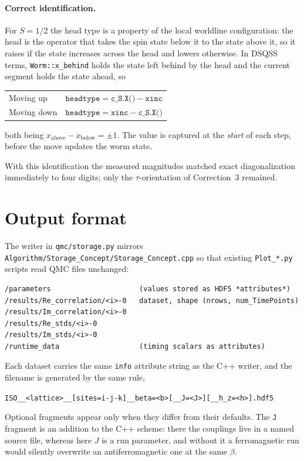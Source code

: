 \documentclass[11pt,a4paper]{article}
\newcommand{\code}[1]{\texttt{#1}}
\begin{document}
\paragraph{Correct identification.} For $S=1/2$ the head type is a property of
the local worldline configuration: the head is the operator that takes the spin
state below it to the state above it, so it raises if the state increases across
the head and lowers otherwise. In DSQSS terms, \code{Worm::x\_behind} holds the
state left behind by the head and the current segment holds the state ahead, so
\begin{center}
\begin{tabular}{ll}
\toprule
Moving up   & $\code{headtype} = \code{c\_S.X()} - \code{xinc}$ \\
Moving down & $\code{headtype} = \code{xinc} - \code{c\_S.X()}$ \\
\bottomrule
\end{tabular}
\end{center}
both being $x_{\text{above}}-x_{\text{below}}=\pm1$. The value is captured at
the \emph{start} of each step, before the move updates the worm state.

With this identification the measured magnitudes matched exact diagonalization
immediately to four digits; only the $\tau$-orientation of
Correction~3 remained.

\section{Output format}
\label{sec:output}

The writer in \code{qmc/storage.py} mirrors
\code{Algorithm/Storage\_Concept/Storage\_Concept.cpp} so that existing
\code{Plot\_*.py} scripts read QMC files unchanged:

\begin{lstlisting}
/parameters                     (values stored as HDF5 *attributes*)
/results/Re_correlation/<i>-0   dataset, shape (nrows, num_TimePoints)
/results/Im_correlation/<i>-0
/results/Re_stds/<i>-0
/results/Im_stds/<i>-0
/runtime_data                   (timing scalars as attributes)
\end{lstlisting}

Each dataset carries the same \code{info} attribute string as the C++ writer,
and the filename is generated by the same rule,
\begin{center}
\code{ISO\_\_<lattice>\_\_[sites=i-j-k]\_\_beta=<b>[\_\_J=<J>][\_\_h\_z=<h>].hdf5}
\end{center}
Optional fragments appear only when they differ from their defaults. The
\code{J} fragment is an addition to the C++ scheme: there the couplings live in
a named source file, whereas here $J$ is a run parameter, and without it a
ferromagnetic run would silently overwrite an antiferromagnetic one at the same
$\beta$.
\end{document}
